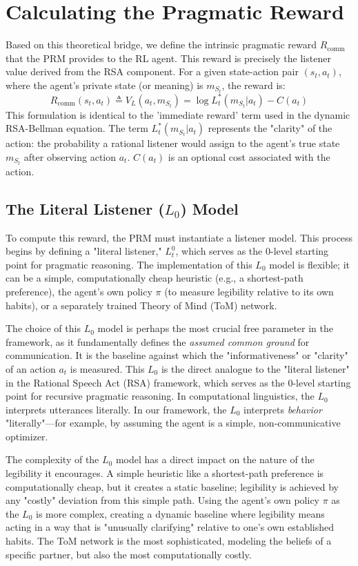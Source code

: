 \documentclass[12pt, a4paper]{report}
\newcommand{\Rcomm}{R_{\text{comm}}}
\newcommand{\VL}{V_L}
\begin{document}
\section{Calculating the Pragmatic Reward}
Based on this theoretical bridge, we define the intrinsic pragmatic reward $\Rcomm$ that the PRM provides to the RL agent. This reward is precisely the listener value derived from the RSA component. For a given state-action pair $(s_t, a_t)$, where the agent's private state (or meaning) is $m_{S_t}$, the reward is:
$$ \Rcomm(s_{t},a_{t}) \triangleq \VL(a_{t},m_{S_{t}}) = \log L_{t}^{*}(m_{S_{t}}|a_{t}) - C(a_{t}) $$
This formulation is identical to the 'immediate reward' term used in the dynamic RSA-Bellman equation. The term $L_{t}^{*}(m_{S_{t}}|a_{t})$ represents the "clarity" of the action: the probability a rational listener would assign to the agent's true state $m_{S_t}$ after observing action $a_t$. $C(a_t)$ is an optional cost associated with the action.

\subsection{The Literal Listener ($L_0$) Model}
To compute this reward, the PRM must instantiate a listener model. This process begins by defining a "literal listener," $L_t^0$, which serves as the 0-level starting point for pragmatic reasoning. The implementation of this $L_0$ model is flexible; it can be a simple, computationally cheap heuristic (e.g., a shortest-path preference), the agent's own policy $\pi$ (to measure legibility relative to its own habits), or a separately trained Theory of Mind (ToM) network.

The choice of this $L_0$ model is perhaps the most crucial free parameter in the framework, as it fundamentally defines the \textit{assumed common ground} for communication. It is the baseline against which the "informativeness" or "clarity" of an action $a_t$ is measured. This $L_0$ is the direct analogue to the "literal listener" in the Rational Speech Act (RSA) framework, which serves as the 0-level starting point for recursive pragmatic reasoning. In computational linguistics, the $L_0$ interprets utterances literally. In our framework, the $L_0$ interprets \textit{behavior} "literally"---for example, by assuming the agent is a simple, non-communicative optimizer.

The complexity of the $L_0$ model has a direct impact on the nature of the legibility it encourages. A simple heuristic like a shortest-path preference is computationally cheap, but it creates a static baseline; legibility is achieved by any "costly" deviation from this simple path. Using the agent's own policy $\pi$ as the $L_0$ is more complex, creating a dynamic baseline where legibility means acting in a way that is "unusually clarifying" relative to one's own established habits. The ToM network is the most sophisticated, modeling the beliefs of a specific partner, but also the most computationally costly.
\end{document}
